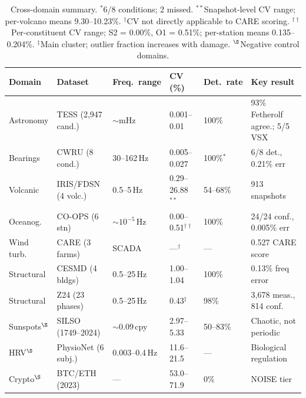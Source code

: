 \documentclass[11pt,a4paper]{article}
\begin{document}
\begin{table}[htbp]
\centering
\caption{Cross-domain summary. $^*$6/8 conditions; 2 missed. $^{**}$Snapshot-level CV range; per-volcano means 9.30--10.23\%. $^\dagger$CV not directly applicable to CARE scoring. $^{\dagger\dagger}$Per-constituent CV range; S2 = 0.00\%, O1 = 0.51\%; per-station means 0.135--0.204\%. $^\ddagger$Main cluster; outlier fraction increases with damage. $^\S$Negative control domains.}
\label{tab:summary}
\smallskip
\footnotesize
\begin{tabular}{lllllp{3.2cm}}
\toprule
\textbf{Domain} & \textbf{Dataset} & \textbf{Freq.\ range} & \textbf{CV (\%)} & \textbf{Det.\ rate} & \textbf{Key result} \\
\midrule
Astronomy  & TESS (2{,}947 cand.) & ${\sim}$mHz  & 0.001--0.01  & 100\%      & 93\% Fetherolf agree.; 5/5 VSX \\
Bearings   & CWRU (8 cond.)      & 30--162\,Hz  & 0.005--0.027 & 100\%$^*$  & 6/8 det., 0.21\% err \\
Volcanic   & IRIS/FDSN (4 volc.) & 0.5--5\,Hz   & 0.29--26.88$^{**}$  & 54--68\%   & 913 snapshots \\
Oceanog.   & CO-OPS (6 stn)      & ${\sim}10^{-5}$\,Hz & 0.00--0.51$^{\dagger\dagger}$ & 100\%      & 24/24 conf., 0.005\% err \\
Wind turb. & CARE (3 farms)      & SCADA        & ---$^\dagger$ & ---        & 0.527 CARE score \\
Structural & CESMD (4 bldgs)     & 0.5--25\,Hz  & 1.00--1.04   & 100\%      & 0.13\% freq error \\
Structural & Z24 (23 phases)     & 0.5--25\,Hz  & 0.43$^\ddagger$ & 98\%    & 3{,}678 meas., 814 conf. \\
\midrule
Sunspots$^\S$   & SILSO (1749--2024)  & ${\sim}$0.09\,cpy & 2.97--5.33 & 50--83\%  & Chaotic, not periodic \\
HRV$^\S$        & PhysioNet (6 subj.) & 0.003--0.4\,Hz    & 11.6--21.5 & ---       & Biological regulation \\
Crypto$^\S$     & BTC/ETH (2023)      & ---                & 53.0--71.9 & 0\%       & NOISE tier \\
\bottomrule
\end{tabular}
\end{table}
\end{document}
